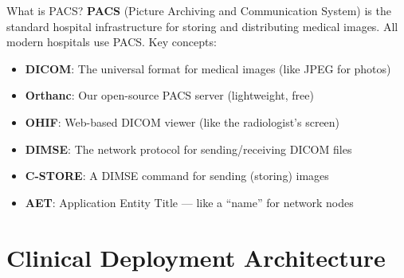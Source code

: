 \documentclass[12pt,a4paper]{report}
\begin{document}
\begin{conceptbox}{What is PACS?}
\textbf{PACS} (Picture Archiving and Communication System) is the standard hospital infrastructure for storing and distributing medical images. All modern hospitals use PACS. Key concepts:
\begin{itemize}
    \item \textbf{DICOM}: The universal format for medical images (like JPEG for photos)
    \item \textbf{Orthanc}: Our open-source PACS server (lightweight, free)
    \item \textbf{OHIF}: Web-based DICOM viewer (like the radiologist's screen)
    \item \textbf{DIMSE}: The network protocol for sending/receiving DICOM files
    \item \textbf{C-STORE}: A DIMSE command for sending (storing) images
    \item \textbf{AET}: Application Entity Title --- like a ``name'' for network nodes
\end{itemize}
\end{conceptbox}

\section{Clinical Deployment Architecture}
\end{document}
